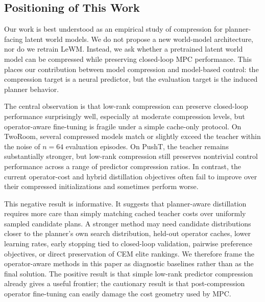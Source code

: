 \documentclass[11pt]{article}
\begin{document}
\subsection{Positioning of This Work}

Our work is best understood as an empirical study of compression for planner-facing latent world models. We do not propose a new world-model architecture, nor do we retrain LeWM. Instead, we ask whether a pretrained latent world model can be compressed while preserving closed-loop MPC performance. This places our contribution between model compression and model-based control: the compression target is a neural predictor, but the evaluation target is the induced planner behavior.

The central observation is that low-rank compression can preserve closed-loop performance surprisingly well, especially at moderate compression levels, but operator-aware fine-tuning is fragile under a simple cache-only protocol. On TwoRoom, several compressed models match or slightly exceed the teacher within the noise of $n=64$ evaluation episodes. On PushT, the teacher remains substantially stronger, but low-rank compression still preserves nontrivial control performance across a range of predictor compression ratios. In contrast, the current operator-cost and hybrid distillation objectives often fail to improve over their compressed initializations and sometimes perform worse.

This negative result is informative. It suggests that planner-aware distillation requires more care than simply matching cached teacher costs over uniformly sampled candidate plans. A stronger method may need candidate distributions closer to the planner's own search distribution, held-out operator caches, lower learning rates, early stopping tied to closed-loop validation, pairwise preference objectives, or direct preservation of CEM elite rankings. We therefore frame the operator-aware methods in this paper as diagnostic baselines rather than as the final solution. The positive result is that simple low-rank predictor compression already gives a useful frontier; the cautionary result is that post-compression operator fine-tuning can easily damage the cost geometry used by MPC.

\end{document}
